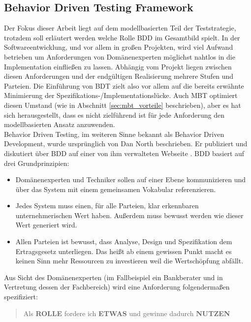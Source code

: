 \subsection{Behavior Driven Testing Framework}
\label{sec:bdd}
Der Fokus dieser Arbeit liegt auf dem modellbasierten Teil der Teststrategie, trotzdem soll erläutert werden welche Rolle \Gls{BDD} im Gesamtbild spielt. In der Softwareentwicklung, und vor allem in großen Projekten, wird viel Aufwand betrieben um Anforderungen von Domänenexperten möglichst nahtlos in die Implementation einfließen zu lassen. Abhängig vom Projekt liegen zwischen diesen Anforderungen und der endgültigen Realisierung mehrere Stufen und Parteien. Die Einführung von BDT zielt also vor allem auf die bereits erwähnte Minimierung der Spezifikations-/Implementationslücke. Auch \Gls{MBT} optimiert diesen Umstand (wie in Abschnitt \ref{sec:mbt_vorteile} beschrieben), aber es hat sich herausgestellt, dass es nicht zielführend ist für jede Anforderung den modellbasierten Ansatz anzuwenden.\\
Behavior Driven Testing, im weiteren Sinne bekannt als Behavior Driven Development, wurde ursprünglich von Dan North beschrieben. Er publiziert und diskutiert über \gls{BDD} auf einer von ihm verwalteten Webseite \cite{north_official_2015}. \gls{BDD} basiert auf drei Grundprinzipien:

\begin{itemize}
\item Domänenexperten und Techniker sollen auf einer Ebene kommunizieren und über das System mit einem gemeinsamen Vokabular referenzieren.
\item Jedes System muss einen, für alle Parteien, klar erkennbaren unternehmerischen Wert haben. Außerdem muss bewusst werden wie dieser Wert generiert wird.
\item Allen Parteien ist bewusst, dass Analyse, Design und Spezifikation dem Ertragsgesetz unterliegen. Das heißt ab einem gewissen Punkt macht es keinen Sinn mehr Ressourcen zu investieren weil die Wertschöpfung abfällt.
\end{itemize}

Aus Sicht des Domänenexperten (im Fallbeispiel ein Bankberater und in Vertretung dessen der Fachbereich) wird eine Anforderung folgendermaßen spezifiziert: 

\begin{quote} Als \textbf{ROLLE} fordere ich \textbf{ETWAS} und gewinne dadurch \textbf{NUTZEN} \end{quote}


